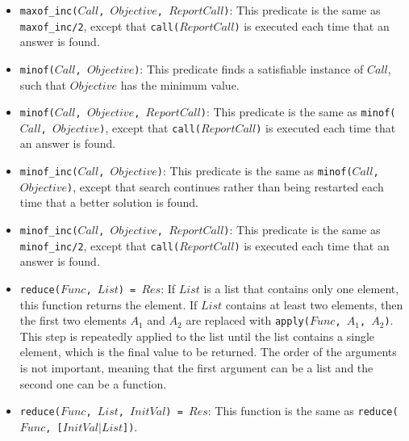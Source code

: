 \begin{itemize}
\item \texttt{maxof\_inc($Call$, $Objective$, $ReportCall$)}: This predicate is the same as \newline \texttt{maxof\_inc/2}, except that \texttt{call($ReportCall$)} is executed each time that an answer is found.
\item \texttt{minof($Call$, $Objective$)}: This predicate finds a satisfiable instance of $Call$, such that $Objective$ has the minimum value. 
\item \texttt{minof($Call$, $Objective$, $ReportCall$)}: This predicate is the same as \texttt{minof($Call$, \newline $Objective$)}, except that \texttt{call($ReportCall$)} is executed each time that an answer is found.
\item \texttt{minof\_inc($Call$, $Objective$)}: This predicate is the same as \texttt{minof($Call$, \newline $Objective$)}, except that search continues rather than being restarted each time that a better solution is found.
\item \texttt{minof\_inc($Call$, $Objective$, $ReportCall$)}: This predicate is the same as \newline \texttt{minof\_inc/2}, except that \texttt{call($ReportCall$)} is executed each time that an answer is found.
\item \texttt{reduce($Func$, $List$) = $Res$}: If $List$ is a list that contains only one element, this function returns the element. If $List$ contains at least two elements, then the first two elements $A_1$ and $A_2$ are replaced with \texttt{apply($Func$, $A_1$, $A_2$)}. This step is repeatedly applied to the list until the list contains a single element, which is the final value to be returned. The order of the arguments is not important, meaning that the first argument can be a list and the second one can be a function.
\item \texttt{reduce($Func$, $List$, $InitVal$) = $Res$}: This function is the same as \newline
 \texttt{reduce($Func$, [$InitVal$$|$$List$])}.
\end{itemize}


